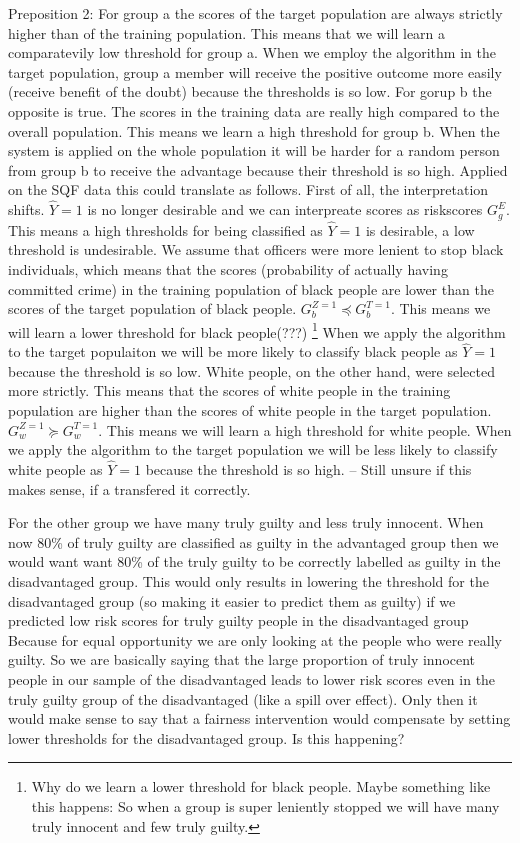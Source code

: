 Preposition 2:
For group a the scores of the target population are always strictly higher than
of the training population. This means that we will learn a comparatevily low threshold for group a.
When we employ the algorithm in the target population, group a member will receive the positive outcome
 more easily (receive benefit of the doubt) because the thresholds is so low. For gorup b
 the opposite is true. The scores in the training data are really high compared to the overall population.
 This means we learn a high threshold for group b. When the system is applied on the whole population it will
 be harder for a random person from group b to receive the advantage because their threshold is so high.
Applied on the SQF data this could translate as follows. First of all, the interpretation shifts. $\hat{Y} = 1$ is 
no longer desirable and we can interpreate scores as riskscores $G_g^{E}$. This means a high thresholds for being classified as $\hat{Y} = 1$ is desirable, a low
threshold is undesirable. We assume that officers were more lenient to stop black individuals, which means that the scores (probability of actually having committed crime) in the training population
of black people are lower than the scores of the target population of black people.
$G_b^{Z=1} \preceq G_b^{T=1}$. This means we will learn a lower threshold for black people(???) \footnote{Why do we learn a lower threshold for black people. Maybe something like this happens: So when a group is super leniently stopped we will have many truly innocent and few truly guilty.}
When we apply the algorithm to the target populaiton we will be more likely to classify black people as $\hat{Y} = 1$ because the threshold is so low. White people, on the other hand,
were selected more strictly. This means that the scores of white people in the training population are higher than the scores of white people in the target population.
$G_w^{Z=1} \succeq G_w^{T=1}$. This means we will learn a high threshold for white people. When we apply the algorithm to the target population we will be less likely to classify white
people as $\hat{Y} = 1$ because the threshold is so high. -- Still unsure if this makes sense, if a transfered it correctly.

For the other group we have many truly guilty and less truly innocent. When now 80\% of truly guilty are classified as guilty in the advantaged group then we would want want 80\% of
the truly guilty to be correctly labelled as guilty in the disadvantaged group. This would only results in lowering the threshold for the disadvantaged group
(so making it easier to predict them as guilty) if we predicted low risk scores for truly guilty people in the disadvantaged group
 Because for equal opportunity we are only looking at the people who were really guilty. So we are basically saying that the large proportion of truly
 innocent people in our sample of the disadvantaged leads to lower risk scores even in the truly guilty group of the disadvantaged (like a spill over effect).
 Only then it would make sense to say that a fairness intervention would compensate by setting lower thresholds for the disadvantaged group. Is this happening? 


